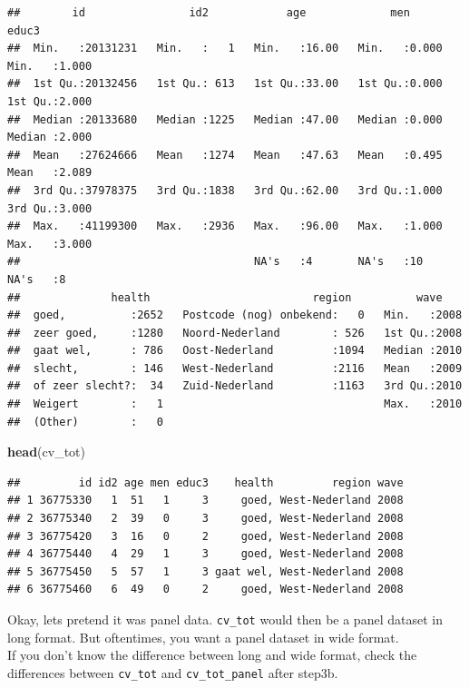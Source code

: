 \documentclass[
]{book}
\newenvironment{Shaded}{\begin{snugshade}}{\end{snugshade}}
\newcommand{\KeywordTok}[1]{\textcolor[rgb]{0.13,0.29,0.53}{\textbf{#1}}}
\newcommand{\NormalTok}[1]{#1}
\begin{document}
\begin{verbatim}
##        id                id2            age             men            educ3      
##  Min.   :20131231   Min.   :   1   Min.   :16.00   Min.   :0.000   Min.   :1.000  
##  1st Qu.:20132456   1st Qu.: 613   1st Qu.:33.00   1st Qu.:0.000   1st Qu.:2.000  
##  Median :20133680   Median :1225   Median :47.00   Median :0.000   Median :2.000  
##  Mean   :27624666   Mean   :1274   Mean   :47.63   Mean   :0.495   Mean   :2.089  
##  3rd Qu.:37978375   3rd Qu.:1838   3rd Qu.:62.00   3rd Qu.:1.000   3rd Qu.:3.000  
##  Max.   :41199300   Max.   :2936   Max.   :96.00   Max.   :1.000   Max.   :3.000  
##                                    NA's   :4       NA's   :10      NA's   :8      
##              health                         region          wave     
##  goed,          :2652   Postcode (nog) onbekend:   0   Min.   :2008  
##  zeer goed,     :1280   Noord-Nederland        : 526   1st Qu.:2008  
##  gaat wel,      : 786   Oost-Nederland         :1094   Median :2010  
##  slecht,        : 146   West-Nederland         :2116   Mean   :2009  
##  of zeer slecht?:  34   Zuid-Nederland         :1163   3rd Qu.:2010  
##  Weigert        :   1                                  Max.   :2010  
##  (Other)        :   0
\end{verbatim}

\begin{Shaded}
\begin{Highlighting}[numbers=left,,]
\KeywordTok{head}\NormalTok{(cv_tot)}
\end{Highlighting}
\end{Shaded}

\begin{verbatim}
##         id id2 age men educ3    health         region wave
## 1 36775330   1  51   1     3     goed, West-Nederland 2008
## 2 36775340   2  39   0     3     goed, West-Nederland 2008
## 3 36775420   3  16   0     2     goed, West-Nederland 2008
## 4 36775440   4  29   1     3     goed, West-Nederland 2008
## 5 36775450   5  57   1     3 gaat wel, West-Nederland 2008
## 6 36775460   6  49   0     2     goed, West-Nederland 2008
\end{verbatim}

Okay, lets pretend it was panel data. \texttt{cv\_tot} would then be a panel dataset in long format. But oftentimes, you want a panel dataset in wide format.\\
If you don't know the difference between long and wide format, check the differences between \texttt{cv\_tot} and \texttt{cv\_tot\_panel} after step3b.
\end{document}
